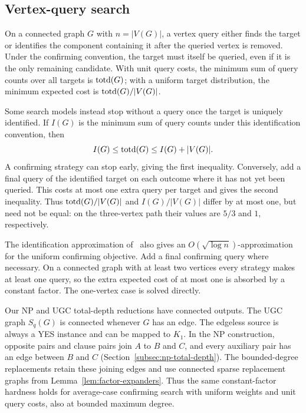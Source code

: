 \subsection{Vertex-query search}
\label{subsec:vertex-query-search}

On a connected graph $G$ with $n=|V(G)|$, a vertex query either finds the target or
identifies the component containing it after the queried vertex is
removed. Under the confirming convention, the target must itself be
queried, even if it is the only remaining candidate. With unit query
costs, the minimum sum of query counts over all targets is $\operatorname{totd}(G)$;
with a uniform target distribution, the minimum expected cost is
$\operatorname{totd}(G)/|V(G)|$.

Some search models instead stop without a query once the target is
uniquely identified. If $I(G)$ is the minimum sum of query counts
under this identification convention, then
\begin{equation}\label{eq:search-identification-offset}
 I(G)\leq\operatorname{totd}(G)\leq I(G)+|V(G)|.
\end{equation}
A confirming strategy can stop early, giving the first inequality.
Conversely, add a final query of the identified target on each outcome
where it has not yet been queried. This costs at most one extra query
per target and gives the second inequality. Thus $\operatorname{totd}(G)/|V(G)|$
and $I(G)/|V(G)|$ differ by at most one, but need not be equal:
on the three-vertex path their values are $5/3$ and $1$, respectively.

The identification approximation of~\cite{Szyfelbein2025GraphSearch}
also gives an $O(\sqrt{\log n})$-approximation for the uniform
confirming objective. Add a final confirming query where necessary.
On a connected graph with at least two vertices every strategy makes
at least one query, so the extra expected cost of at most one is
absorbed by a constant factor. The one-vertex case is solved directly.

Our NP and UGC total-depth reductions have connected outputs. The UGC
graph $S_q(G)$ is connected whenever $G$ has an edge. The edgeless
source is always a YES instance and can be mapped to $K_1$. In the NP
construction, opposite pairs and clause pairs join $A$ to $B$ and $C$,
and every auxiliary pair has an edge between $B$ and $C$
(Section~\ref{subsec:np-total-depth}). The bounded-degree replacements
retain these joining edges and use connected sparse replacement graphs
from Lemma~\ref{lem:factor-expanders}. Thus the same constant-factor
hardness holds for average-case confirming search with uniform weights
and unit query costs, also at bounded maximum degree.

